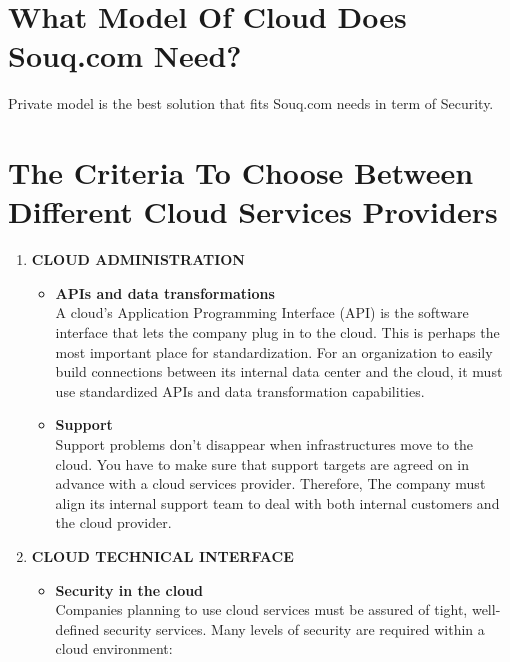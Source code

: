 \documentclass{book}
\begin{document}
\section{What Model Of Cloud Does Souq.com Need?}
Private model is the best solution that fits Souq.com needs in term of Security.\\

\section{The Criteria To Choose Between Different Cloud Services Providers}

\begin{enumerate}

\item \textbf{CLOUD ADMINISTRATION\\}

\begin{itemize}


\item \textbf{APIs and data transformations\\}
A cloud’s Application Programming Interface (API) is the software interface that lets the company plug in to the cloud. This is perhaps the most important place for standardization. For an organization to easily build connections between its internal data center and the cloud, it must use standardized APIs and data transformation capabilities.\\

\item \textbf{Support\\}
Support problems don't disappear when infrastructures move to the cloud. You have to make sure that support targets are agreed on in advance with a cloud services provider. Therefore, The company must align its internal support team to deal with both internal customers and the cloud provider.\\

\end{itemize}

\item \textbf{CLOUD TECHNICAL INTERFACE\\}

\begin{itemize}

\item \textbf{Security in the cloud\\}
Companies planning to use cloud services must be assured of tight, well-defined security services. Many levels of security are required within a cloud environment:\\
\begin{itemize}


\end{itemize}
\end{itemize}
\end{enumerate}
\end{document}
